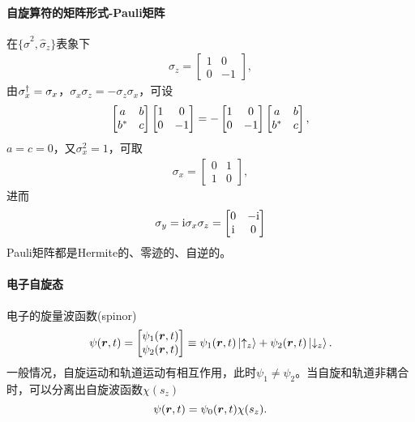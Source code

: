 \paragraph*{自旋算符的矩阵形式-Pauli矩阵}在$\{\hat\sigma^2,\hat\sigma_z\}$表象下
\begin{align}
	\sigma_z=\begin{bmatrix}
		1&0\\0&-1
	\end{bmatrix},
\end{align}
由$\sigma_x^\dagger=\sigma_x$，$\sigma_x\sigma_z=-\sigma_z\sigma_x$，可设
\[
	\begin{bmatrix}
	a&b\\b^\ast&c
\end{bmatrix}\begin{bmatrix}
	1&0\\0&-1
\end{bmatrix}=-\begin{bmatrix}
	1&0\\0&-1
\end{bmatrix}\begin{bmatrix}
	a&b\\b^\ast&c
\end{bmatrix},
\]
$a=c=0$，又$\sigma_x^2=1$，可取
\begin{align}
	\sigma_x=\begin{bmatrix}
		0&1\\1&0
	\end{bmatrix},
\end{align}
进而
\begin{align}
	\sigma_y=\mathrm{i}\sigma_x\sigma_z=\begin{bmatrix}
		0&-\mathrm{i}\\\mathrm{i}&0
	\end{bmatrix}
\end{align}
Pauli矩阵都是Hermite的、零迹的、自逆的。
\paragraph*{电子自旋态}电子的旋量波函数(spinor)
\[
	\psi(\bm r,t)=\begin{bmatrix}
	\psi_1(\bm r,t)\\\psi_2(\bm r,t)
\end{bmatrix}\equiv\psi_1(\bm r,t)\left\vert \uparrow_z\right\rangle+\psi_2(\bm r,t)\left\vert \downarrow_z\right\rangle.
\]
一般情况，自旋运动和轨道运动有相互作用，此时$\psi_1\neq\psi_2$。当自旋和轨道非耦合时，可以分离出自旋波函数$\chi(s_z)$
\[
	\psi(\bm r,t)=\psi_0(\bm r,t)\chi(s_z).
\]

